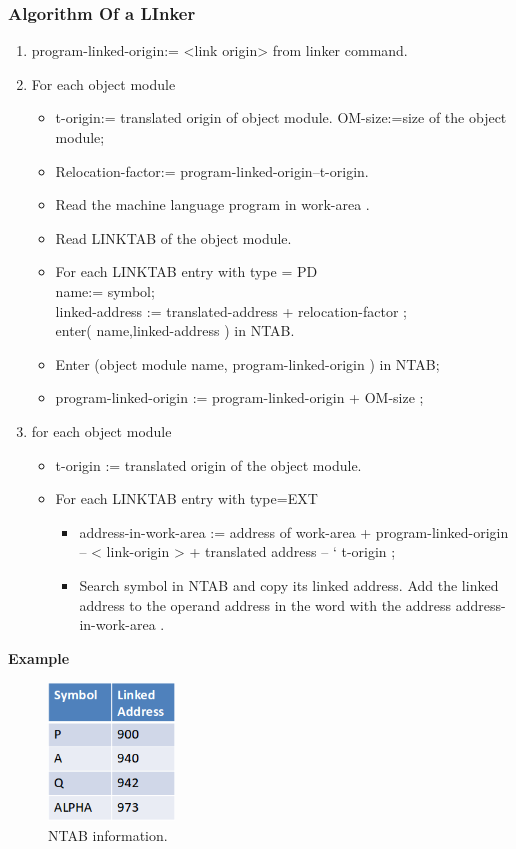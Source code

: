 \documentclass[12pt]{article}
\begin{document}
\subsubsection{Algorithm Of a LInker}
\begin{enumerate}
\item program-linked-origin:= <link origin> from linker command.
\item For each object module \begin{itemize}
  \item t-origin:= translated origin of object module. OM-size:=size of the object module;
  \item Relocation-factor:= program-linked-origin–t-origin. \item Read the machine language program in 
work-area
. \item Read LINKTAB of the object module. \item For each LINKTAB entry with type = PD\\name:= symbol;\\linked-address
:= 
translated-address
+ 
relocation-factor
;\\enter(
name,linked-address
) in NTAB.\item Enter (object module name, 
program-linked-origin
) in NTAB; \item  
program-linked-origin
:= 
program-linked-origin
+ 
OM-size
;

\end{itemize}
\item for each object module \begin{itemize}
  \item  
t-origin
:= translated origin of the object 
module.
  \item For each LINKTAB entry with type=EXT \begin{itemize}
  \item address-in-work-area
:= 
address of 
work-area
+ 
program-linked-origin
–
<
link-origin
> + translated address 
–
`
t-origin
;
  \item Search symbol in NTAB and copy its
linked address. Add the linked address 
to the operand address in the word with 
the address 
address-in-work-area
.
\end{itemize}
\end{itemize}
\end{enumerate}
\textbf{Example}\\
\begin{figure}[H]
\centering
\includegraphics[width=0.3\textwidth]{ntab.png}
\caption{\label{fig:ex_link} NTAB information.}
\end{figure}
\end{document}
